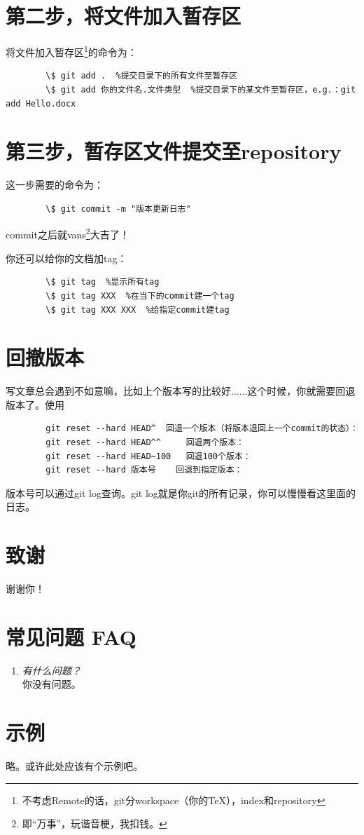 \documentclass[cn,hazy,sakura,screen,14pt]{elegantnote}
\begin{document}
	
	\section{第二步，将文件加入暂存区}
	将文件加入暂存区\footnote{不考虑Remote的话，git分workspace（你的\TeX{}），index和repository}的命令为：
	\begin{lstlisting}
		\$ git add .  %提交目录下的所有文件至暂存区
		\$ git add 你的文件名.文件类型  %提交目录下的某文件至暂存区，e.g.：git add Hello.docx	
	\end{lstlisting}

	\section{第三步，暂存区文件提交至repository}
	这一步需要的命令为：
	\begin{lstlisting}
		\$ git commit -m "版本更新日志"	
	\end{lstlisting}	
	commit之后就vans\footnote{即“万事”，玩谐音梗，我扣钱。}大吉了！

	\begin{note}
		你还可以给你的文档加tag：
		\begin{lstlisting}
		\$ git tag  %显示所有tag
		\$ git tag XXX 	%在当下的commit建一个tag
		\$ git tag XXX XXX 	%给指定commit建tag
		\end{lstlisting}
	\end{note}
	
	\section{回撤版本}	
	写文章总会遇到不如意嘛，比如上个版本写的比较好......这个时候，你就需要回退版本了。使用
	\begin{lstlisting}
		git reset --hard HEAD^ 	回退一个版本（将版本退回上一个commit的状态）：
		git reset --hard HEAD^^ 	回退两个版本：
		git reset --hard HEAD~100  	回退100个版本：
		git reset --hard 版本号  	回退到指定版本：	
	\end{lstlisting}
	版本号可以通过git log查询。git log就是你git的所有记录，你可以慢慢看这里面的日志。
	
	\section{致谢}
	谢谢你！
		
	
	\section{常见问题 FAQ}
	\begin{enumerate}[label=\arabic*).]
		\item \textit{有什么问题？}\\
		你没有问题。
	\end{enumerate}
	
	\section{示例}
	略。或许此处应该有个示例吧。
	
\end{document}
